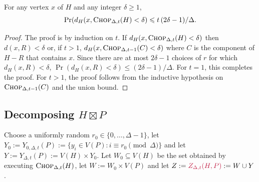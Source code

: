 \documentclass{patmorin}
\makeatletter
\renewcommand{\ge}{\geqslant}
\renewcommand{\le}{\leqslant}
\newcommand{\defin}[1]{\emph{\textcolor{brightmaroon}{#1}}}
\def\mathcolor#1#{\@mathcolor{#1}}
\def\@mathcolor#1#2#3{%
  \protect\leavevmode
  \begingroup
    \color#1{#2}#3%
  \endgroup
}
\newcommand{\mathdefin}[1]{\mathcolor{brightmaroon}{#1}}
\makeatother
\begin{document}


\begin{lem}\label{delta_bad_h}
  For any vertex $x$ of $H$ and any integer $\delta\ge 1$, $$\Pr(d_H(x, \textsc{Chop}_{\Delta,t}(H)< \delta)\le t\,(2\delta-1)/\Delta.$$
\end{lem}

\begin{proof}
  The proof is by induction on $t$. If $d_H(x,\textsc{Chop}_{\Delta,t}(H) < \delta)$ then $d(x,R)< \delta$ or, if $t>1$,  $d_H(x,\textsc{Chop}_{\Delta,t-1}(C) < \delta)$ where $C$ is the component of $H-R$ that contains $x$.  Since there are at most $2\delta-1$ choices of $r$ for which $d_H(x,R)<\delta$, $\Pr(d_H(x,R)<\delta) \le (2\delta-1)/\Delta$. For $t=1$, this completes the proof.  For $t>1$, the proof follows from the inductive hypothesis on $\textsc{Chop}_{\Delta,t-1}(C)$ and the union bound.
\end{proof}

\subsection{\boldmath Decomposing $H\boxtimes P$}


Choose a uniformly random $r_0\in\{0,\ldots,\Delta-1\}$, let $Y_0:=Y_{0,\Delta,t}(P):=\{y_i\in V(P):i\equiv r_0\pmod\Delta\}$ and let $Y:=Y_{\Delta,t}(P):=V(H)\times Y_0$.  Let $W_0\subseteq V(H)$ be the set obtained by executing $\textsc{Chop}_{\Delta,t}(H)$, let $W:=W_0\times V(P)$ and let $Z:=\mathdefin{Z_{\Delta,t}(H,P)}:=W\cup Y$.

\end{document}
